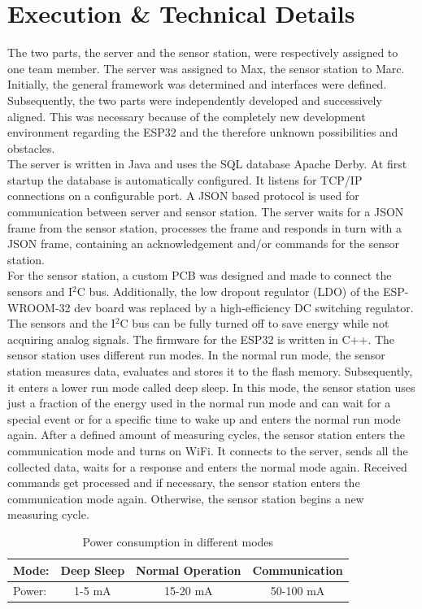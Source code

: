 \section{Execution \& Technical Details}
The two parts, the server and the sensor station, were respectively assigned to one team member. The server was assigned to Max, the sensor station to Marc. Initially, the general framework was determined and interfaces were defined. Subsequently, the two parts were independently developed and successively aligned. This was necessary because of the completely new development environment regarding the ESP32 and the therefore unknown possibilities and obstacles.\\

The server is written in Java and uses the SQL database Apache Derby.
At first startup the database is automatically configured. It listens for TCP/IP connections on a configurable port. A JSON based protocol is used for communication between server and sensor station. The server waits for a JSON frame from the sensor station, processes the frame and responds in turn with a JSON frame, containing an acknowledgement and/or commands for the sensor station.\\

For the sensor station, a custom PCB was designed and made to connect the sensors and I${}^{2}$C bus. Additionally, the low dropout regulator (LDO) of the ESP-WROOM-32 dev board was replaced by a high-efficiency DC switching regulator. The sensors and the I${}^{2}$C bus can be fully turned off to save energy while not acquiring analog signals. The firmware for the ESP32 is written in C++.
The sensor station uses different run modes. In the normal run mode, the sensor station measures data, evaluates and stores it to the flash memory. Subsequently, it enters a lower run mode called deep sleep. In this mode, the sensor station uses just a fraction of the energy used in the normal run mode and can wait for a special event or for a specific time to wake up and enters the normal run mode again. After a defined amount of measuring cycles, the sensor station enters the communication mode and turns on WiFi. It connects to the server, sends all the collected data, waits for a response and enters the normal mode again. Received commands get processed and if necessary, the sensor station enters the communication mode again. Otherwise, the sensor station begins a new measuring cycle.
\begin{table}[htbp]
	\begin{center}
		\begin{tabular}{|l|c|c|c|}
			\hline 
			Mode: & Deep Sleep & Normal Operation & Communication \\ 
			\hline 
			Power: & 1-5 mA & 15-20 mA & 50-100 mA \\ 
			\hline 
		\end{tabular} 
	\end{center}
	\caption{Power consumption in different modes}
\end{table}\\

